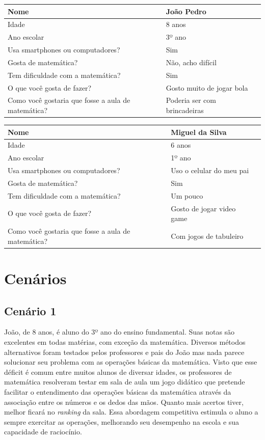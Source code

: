 \documentclass[
    12pt,               %
    openany,          	%
    twoside,            %
    a4paper,            %
    brazil              %
    ]{abntex2}
\begin{document}
\begin{center} \begin{tabular}{ | l | p{5cm} | p{6cm} }
\hline Nome & João Pedro \\\hline
Idade & 8 anos\\ \hline
Ano escolar & 3º ano\\ \hline Usa
smartphones ou computadores? & Sim \\ \hline
Gosta de matemática? & Não, acho difícil \\ \hline
Tem dificuldade com a matemática? & Sim \\ \hline
O que você gosta de fazer? & Gosto muito de jogar bola \\ \hline
Como você gostaria que fosse a aula de matemática? & Poderia ser com brincadeiras \\ \hline
\end{tabular} \end{center}

\begin{center} \begin{tabular}{ | l | p{5cm} | p{6cm} }
\hline Nome & Miguel da Silva \\\hline
Idade & 6 anos\\ \hline
Ano escolar & 1º ano\\ \hline Usa
smartphones ou computadores? & Uso o celular do meu pai \\ \hline
Gosta de matemática? & Sim \\ \hline
Tem dificuldade com a matemática? & Um pouco \\ \hline
O que você gosta de fazer? & Gosto de jogar video game \\ \hline
Como você gostaria que fosse a aula de matemática? & Com jogos de tabuleiro \\ \hline
\end{tabular} \end{center}

\chapter{Cenários}

\section{Cenário 1}
João, de 8 anos, é aluno do 3º ano do ensino fundamental. Suas notas são
excelentes em todas matérias, com exceção da matemática. Diversos métodos
alternativos foram testados pelos professores e pais do João mas nada parece
solucionar seu problema com as operações básicas da matemática. Visto que esse
déficit é comum entre muitos alunos de diversar idades, os professores de
matemática resolveram testar em sala de aula um jogo didático que pretende
facilitar o entendimento das operações básicas da matemática através da
associação entre os números e os dedos das mãos. Quanto mais acertos tiver,
melhor ficará no \textit{ranking} da sala. Essa abordagem competitiva estimula
o aluno a sempre exercitar as operações, melhorando seu desempenho na escola e
sua capacidade de raciocínio.
\end{document}

